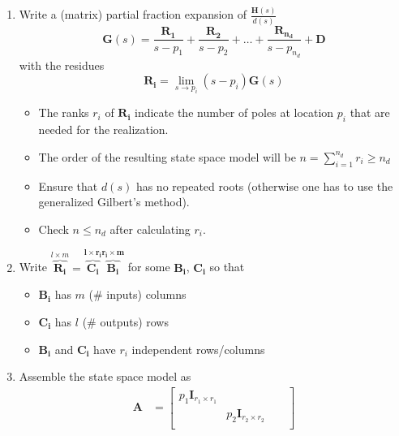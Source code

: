 \newpar{}
\begin{enumerate}
    \item Write a (matrix) partial fraction expansion of $\frac{\mathbf{H}(s)}{d(s)}$
          \begin{equation*}
              \mathbf{G}(s)=\frac{\mathbf{R_1}}{s-p_1}+\frac{\mathbf{R_2}}{s-p_2}+\ldots+\frac{\mathbf{R_{n_d}}}{s-p_{n_d}}+\mathbf{D}
          \end{equation*} with the residues
          \begin{equation*}
              \mathbf{R_i}=\lim_{s\to p_i}(s-p_i)\mathbf{G}(s)
          \end{equation*}
          \begin{itemize}
              \item The ranks $r_i$ of $\mathbf{R_i}$ indicate the number of poles at location $p_i$ that are needed for the realization.
              \item The order of the resulting state space model will be $n=\sum_{i=1}^{n_d}r_i\geq n_d$
              \item Ensure that $d(s)$ has no repeated roots (otherwise one has to use the generalized Gilbert's method).
              \item Check $n\le n_d$ after calculating $r_i$.
          \end{itemize}
    \item Write $\overbrace{\mathbf{R_i}}^{l\times m}=\mathbf{\overbrace{\mathbf{C}_i}^{l\times r_i}\overbrace{ \mathbf{B}_i}^{r_i \times m}}$ for some $\mathbf{B_i}$, $\mathbf{C_i}$ so that
          \begin{itemize}
              \item $\mathbf{B_i}$ has $m$ (\# inputs) columns
              \item $\mathbf{C_i}$ has $l$ (\# outputs) rows
              \item $\mathbf{B_i}$ and $\mathbf{C_i}$ have $r_i$ independent rows/columns
          \end{itemize}
    \item Assemble the state space model as
          \begin{align*}
              \mathbf{A} & =\begin{bmatrix}
                                p_1 \mathbf{I}_{r_1\times r_1} &                                &        &                                            \\
                                                               & p_2 \mathbf{I}_{r_2\times r_2} &        &                                            \\

\end{bmatrix}
\end{align*}
\end{enumerate}
